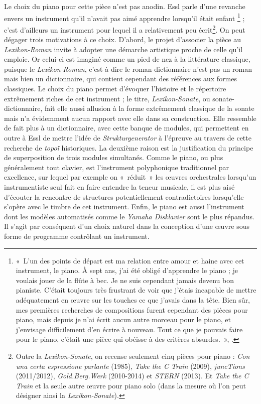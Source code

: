 \documentclass[a4paper,12pt]{article}
\newcommand{\guill}[1]{«~#1~»}
\begin{document}
Le choix du piano pour cette pièce n'est pas anodin. Essl parle d'une revanche envers un instrument qu'il n'avait pas aimé apprendre lorsqu'il était enfant
\footnote{\guill{L'un des points de départ est ma relation entre amour et haine avec cet instrument, le piano. À sept ans, j'ai été obligé d'apprendre le piano ; je voulais jouer de la flûte à bec. Je ne suis cependant jamais devenu bon pianiste. C'était toujours très frustrant de voir que j'étais incapable de mettre adéquatement en œuvre sur les touches ce que j'avais dans la tête. Bien sûr, mes premières recherches de compositions furent cependant des pièces pour piano, mais depuis je n'ai écrit aucun autre morceau pour le piano, et j'envisage difficilement d'en écrire à nouveau. Tout ce que je pouvais faire pour le piano, c'était une pièce qui obéisse à des critères absurdes.}, \cite{ehrler}.} ; c'est d'ailleurs un instrument pour lequel il a relativement peu écrit\footnote{Outre la \emph{Lexikon-Sonate}, on recense seulement cinq pièces pour piano : \emph{Con una certa espressione parlante} (1985), \emph{Take the C Train} (2009), \emph{juncTions} (2011/2012), \emph{Gold.Berg.Werk} (2010-2014) et \emph{STERN} (2013). Et \emph{Take the C Train} et la seule autre œuvre pour piano solo (dans la mesure où l'on peut désigner ainsi la \emph{Lexikon-Sonate}).}. On peut dégager trois motivations à ce choix. D'abord, le projet d'associer la pièce au \emph{Lexikon-Roman} invite à adopter une démarche artistique proche de celle qu'il emploie. Or celui-ci est imaginé comme un pied de nez à la littérature classique, puisque le \emph{Lexikon-Roman}, c'est-à-dire le roman-dictionnaire n'est pas un roman mais bien un dictionnaire, qui contient cependant des références aux formes classiques. Le choix du piano permet d'évoquer l'histoire et le répertoire extrêmement riches de cet instrument ; le titre, \emph{Lexikon-Sonate}, ou sonate-dictionnaire, fait elle aussi allusion à la forme extrêmement classique de la sonate mais n'a évidemment aucun rapport avec elle dans sa construction. Elle ressemble de fait plus à un dictionnaire, avec cette banque de modules, qui permettent en outre à Essl de mettre l'idée de \emph{Strukturgenerator} à l'épreuve au travers de cette recherche de \emph{topoï} historiques. La deuxième raison est la justification du principe de superposition de trois modules simultanés. Comme le piano, ou plus généralement tout clavier, est l'instrument polyphonique traditionnel par excellence, sur lequel par exemple on \guill{réduit} les œuvres orchestrales lorsqu'un instrumentiste seul fait en faire entendre la teneur musicale, il est plus aisé d'écouter la rencontre de structures potentiellement contradictoires lorsqu'elle s'opère avec le timbre de cet instrument. Enfin, le piano est aussi l'instrument dont les modèles automatisés comme le \emph{Yamaha Disklavier} sont le plus répandus. Il s'agit par conséquent d'un choix naturel dans la conception d'une œuvre sous forme de programme contrôlant un instrument.
\end{document}
